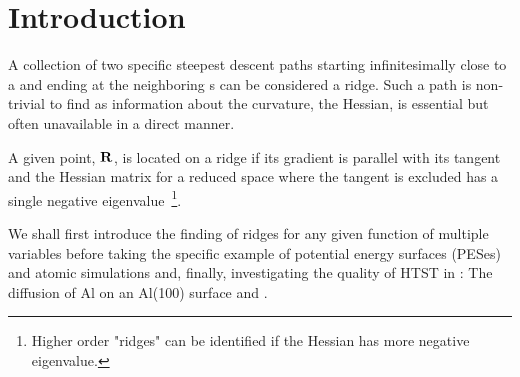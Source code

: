 \section{Introduction}
\label{sec:erm-introduction}

A collection of two specific steepest descent paths starting infinitesimally close to a  and ending at the neighboring s can be considered a ridge.
Such a path is non-trivial to find as information about the curvature, the Hessian, is essential but often unavailable in a direct manner.

A given point, ${\mathrm{\mathbf{\bm{R}}}}$, is located on a ridge if its gradient is parallel with its tangent and the Hessian matrix for a reduced space where the tangent is excluded has a single negative eigenvalue~\footnote{Higher order "ridges" can be identified if the Hessian has more negative eigenvalue.}.






We shall first introduce the finding of ridges for any given function of multiple variables before taking the specific example of potential energy surfaces (PESes) and atomic simulations and,
finally, investigating the quality of HTST in :
The diffusion of Al on an Al(100) surface and .


\incomplete
